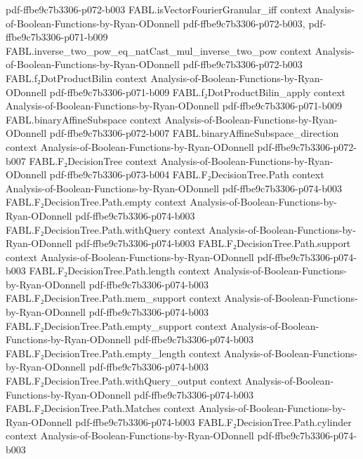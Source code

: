 \begin{theorem}
  {pdf-ffbe9c7b3306-p072-b003}
\proofstep
  {FABL.isVectorFourierGranular_iff}
  {context}
  {Analysis-of-Boolean-Functions-by-Ryan-ODonnell}
  {pdf-ffbe9c7b3306-p072-b003,
    pdf-ffbe9c7b3306-p071-b009}
\proofstep
  {FABL.inverse_two_pow_eq_natCast_mul_inverse_two_pow}
  {context}
  {Analysis-of-Boolean-Functions-by-Ryan-ODonnell}
  {pdf-ffbe9c7b3306-p072-b003}
\proofstep
  {FABL.f₂DotProductBilin}
  {context}
  {Analysis-of-Boolean-Functions-by-Ryan-ODonnell}
  {pdf-ffbe9c7b3306-p071-b009}
\proofstep
  {FABL.f₂DotProductBilin_apply}
  {context}
  {Analysis-of-Boolean-Functions-by-Ryan-ODonnell}
  {pdf-ffbe9c7b3306-p071-b009}
\proofstep
  {FABL.binaryAffineSubspace}
  {context}
  {Analysis-of-Boolean-Functions-by-Ryan-ODonnell}
  {pdf-ffbe9c7b3306-p072-b007}
\proofstep
  {FABL.binaryAffineSubspace_direction}
  {context}
  {Analysis-of-Boolean-Functions-by-Ryan-ODonnell}
  {pdf-ffbe9c7b3306-p072-b007}
\proofstep
  {FABL.F₂DecisionTree}
  {context}
  {Analysis-of-Boolean-Functions-by-Ryan-ODonnell}
  {pdf-ffbe9c7b3306-p073-b004}
\proofstep
  {FABL.F₂DecisionTree.Path}
  {context}
  {Analysis-of-Boolean-Functions-by-Ryan-ODonnell}
  {pdf-ffbe9c7b3306-p074-b003}
\proofstep
  {FABL.F₂DecisionTree.Path.empty}
  {context}
  {Analysis-of-Boolean-Functions-by-Ryan-ODonnell}
  {pdf-ffbe9c7b3306-p074-b003}
\proofstep
  {FABL.F₂DecisionTree.Path.withQuery}
  {context}
  {Analysis-of-Boolean-Functions-by-Ryan-ODonnell}
  {pdf-ffbe9c7b3306-p074-b003}
\proofstep
  {FABL.F₂DecisionTree.Path.support}
  {context}
  {Analysis-of-Boolean-Functions-by-Ryan-ODonnell}
  {pdf-ffbe9c7b3306-p074-b003}
\proofstep
  {FABL.F₂DecisionTree.Path.length}
  {context}
  {Analysis-of-Boolean-Functions-by-Ryan-ODonnell}
  {pdf-ffbe9c7b3306-p074-b003}
\proofstep
  {FABL.F₂DecisionTree.Path.mem_support}
  {context}
  {Analysis-of-Boolean-Functions-by-Ryan-ODonnell}
  {pdf-ffbe9c7b3306-p074-b003}
\proofstep
  {FABL.F₂DecisionTree.Path.empty_support}
  {context}
  {Analysis-of-Boolean-Functions-by-Ryan-ODonnell}
  {pdf-ffbe9c7b3306-p074-b003}
\proofstep
  {FABL.F₂DecisionTree.Path.empty_length}
  {context}
  {Analysis-of-Boolean-Functions-by-Ryan-ODonnell}
  {pdf-ffbe9c7b3306-p074-b003}
\proofstep
  {FABL.F₂DecisionTree.Path.withQuery_output}
  {context}
  {Analysis-of-Boolean-Functions-by-Ryan-ODonnell}
  {pdf-ffbe9c7b3306-p074-b003}
\proofstep
  {FABL.F₂DecisionTree.Path.Matches}
  {context}
  {Analysis-of-Boolean-Functions-by-Ryan-ODonnell}
  {pdf-ffbe9c7b3306-p074-b003}
\proofstep
  {FABL.F₂DecisionTree.Path.cylinder}
  {context}
  {Analysis-of-Boolean-Functions-by-Ryan-ODonnell}
  {pdf-ffbe9c7b3306-p074-b003}

\end{theorem}
